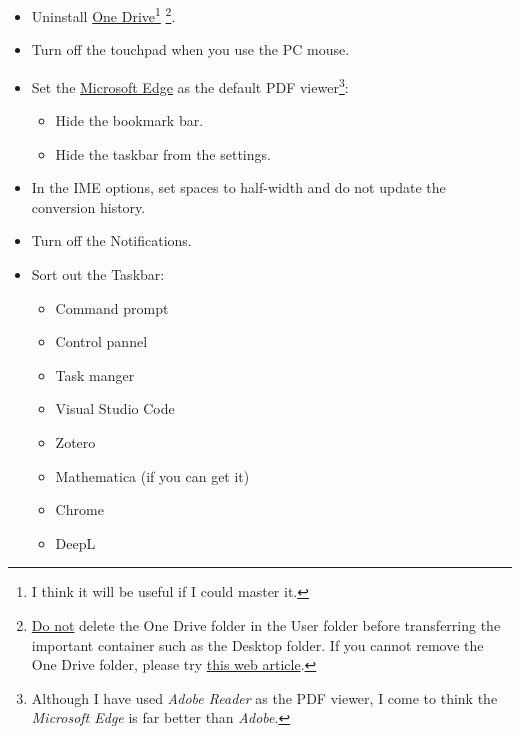\documentclass[a4paper,pdftex]{article}
\begin{document}
\begin{itemize}
  \item 
  Uninstall \uline{One Drive}\footnote{
    I think it will be useful if I could master it.
  } \footnote{
    \uline{Do not} delete the One Drive folder in the User folder before transferring the important container such as the Desktop folder. If you cannot remove the One Drive folder, please try \href{https://www.pc-jozu.com/trouble/onedrive-file-delete/}{this web article}.
  }.

  \item 
  Turn off the touchpad when you use the PC mouse.

  \item 
  Set the \uline{Microsoft Edge} as the default PDF viewer\footnote{
    Although I have used \textit{Adobe Reader} as the PDF viewer, I come to think the \textit{Microsoft Edge} is far better than \textit{Adobe}.
  }:
  \begin{itemize}
    \item 
    Hide the bookmark bar.

    \item 
    Hide the taskbar from the settings.

  \end{itemize}
  
  \item 
  In the IME options, set spaces to half-width and do not update the conversion history.

  \item 
  Turn off the Notifications.

  \item 
  Sort out the Taskbar:
  \begin{itemize}
    \item 
    Command prompt

    \item 
    Control pannel

    \item 
    Task manger

    \item 
    Visual Studio Code

    \item 
    Zotero

    \item 
    Mathematica (if you can get it)

    \item 
    Chrome
    \item 
    DeepL

  \end{itemize}


\end{itemize}
\end{document}
